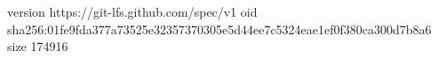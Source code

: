 version https://git-lfs.github.com/spec/v1
oid sha256:01fe9fda377a73525e32357370305e5d44ee7c5324eae1ef0f380ca300d7b8a6
size 174916
